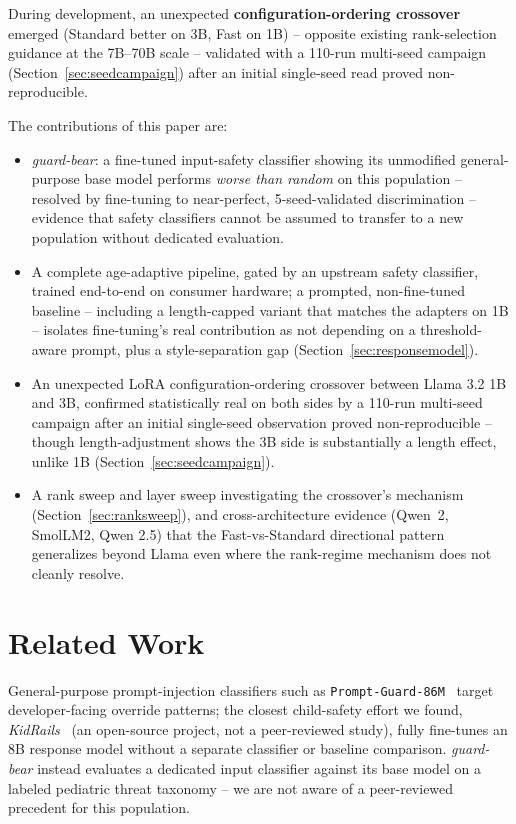 \documentclass[pdflatex,sn-mathphys-num]{sn-jnl-official}%
\begin{document}
During development, an unexpected \textbf{configuration-ordering crossover} emerged (Standard better on 3B, Fast on 1B) -- opposite existing rank-selection guidance at the 7B--70B scale -- validated with a 110-run multi-seed campaign (Section~\ref{sec:seedcampaign}) after an initial single-seed read proved non-reproducible.

\medskip\noindent The contributions of this paper are:
\begin{itemize}
    \item \textit{guard-bear}: a fine-tuned input-safety classifier showing its unmodified general-purpose base model performs \textit{worse than random} on this population -- resolved by fine-tuning to near-perfect, 5-seed-validated discrimination -- evidence that safety classifiers cannot be assumed to transfer to a new population without dedicated evaluation.
    \item A complete age-adaptive pipeline, gated by an upstream safety classifier, trained end-to-end on consumer hardware; a prompted, non-fine-tuned baseline -- including a length-capped variant that matches the adapters on 1B -- isolates fine-tuning's real contribution as not depending on a threshold-aware prompt, plus a style-separation gap (Section~\ref{sec:responsemodel}).
    \item An unexpected LoRA configuration-ordering crossover between Llama 3.2 1B and 3B, confirmed statistically real on both sides by a 110-run multi-seed campaign after an initial single-seed observation proved non-reproducible -- though length-adjustment shows the 3B side is substantially a length effect, unlike 1B (Section~\ref{sec:seedcampaign}).
    \item A rank sweep and layer sweep investigating the crossover's mechanism (Section~\ref{sec:ranksweep}), and cross-architecture evidence (Qwen~2, SmolLM2, Qwen 2.5) that the Fast-vs-Standard directional pattern generalizes beyond Llama even where the rank-regime mechanism does not cleanly resolve.
\end{itemize}

\section{Related Work}\label{sec:relatedwork}

General-purpose prompt-injection classifiers such as \texttt{Prompt-Guard-86M}~\cite{promptguard2024} target developer-facing override patterns; the closest child-safety effort we found, \textit{KidRails}~\cite{kidrails2025} (an open-source project, not a peer-reviewed study), fully fine-tunes an 8B response model without a separate classifier or baseline comparison. \textit{guard-bear} instead evaluates a dedicated input classifier against its base model on a labeled pediatric threat taxonomy -- we are not aware of a peer-reviewed precedent for this population.
\end{document}
